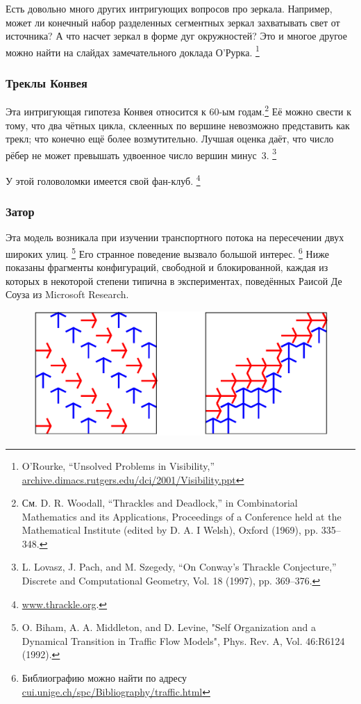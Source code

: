 Есть довольно много других интригующих вопросов про зеркала.
Например, может ли конечный набор разделенных сегментных зеркал захватывать свет от источника?
А что насчет зеркал в форме дуг окружностей?
Это и многое другое можно найти на слайдах замечательного доклада О’Рурка.%
\footnote{O'Rourke, ``Unsolved Problems in Visibility,''
\href{http://archive.dimacs.rutgers.edu/dci/2001/Visibility.ppt}{archive.dimacs.rutgers.edu/dci/2001/Visibility.ppt}}

\subsubsection*{Треклы Конвея}

Эта интригующая гипотеза Конвея относится к 60-ым годам.\footnote{См. D. R. Woodall, ``Thrackles and Deadlock,'' in  Combinatorial Mathematics and its Applications, Proceedings of a Conference held at the Mathematical Institute (edited by D. A. I Welsh), Oxford (1969), pp. 335--348.}
Её можно свести к тому, что два чётных цикла, склеенных по вершине невозможно представить как трекл;
что конечно ещё более возмутительно.
Лучшая оценка даёт, что число рёбер не может превышать удвоенное число вершин минус~3.%
\footnote{L. Lovasz, J. Pach, and M. Szegedy, ``On Conway's Thrackle Conjecture,'' Discrete and Computational Geometry, Vol. 18 (1997), pp. 369--376.}

У этой головоломки имеется свой фан-клуб.%
\footnote{\href{http://www.thrackle.org}{www.thrackle.org}.}

\subsubsection*{Затор}

Эта модель возникала при изучении транспортного потока на пересечении двух широких улиц.%
\footnote{O. Biham, A. A. Middleton, and D. Levine, "Self Organization and a Dynamical Transition in Traffic Flow Models", Phys. Rev. A, Vol. 46:R6124 (1992).}
Его странное поведение вызвало большой интерес.%
\footnote{Библиографию можно найти по адресу \href{http://cui.unige.ch/spc/Bibliography/traffic.html.}{cui.unige.ch/spc/Bibliography/traffic.html}}
Ниже показаны фрагменты конфигураций, свободной и блокированной, каждая из которых в некоторой степени типична в экспериментах, поведённых Раисой Де Соуза из Microsoft Research.

\begin{figure}[h!]
\centering
\includegraphics[scale=0.5]{Figs/UnsolvedPuzzles/gridlock}
\end{figure}

